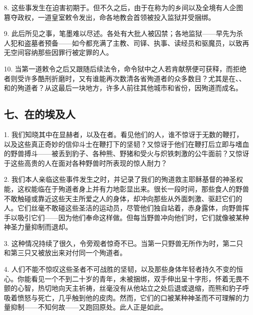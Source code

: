 8. 这些事发生在迫害初期于。但不久之后，由于在称为的乡间以及全境有人企图篡夺政权，一道皇室敕令发出，命各地教会首领被投入监狱并受捆绑。\par

9. 此后所见之事，笔墨难以尽述。各处有大批人被囚禁；各地监狱——早先为杀人犯和盗墓者预备——如今都充满了主教、司铎、执事、读经员和驱魔员，以致再无空间容纳那些因罪行被定罪的人。\par

10. 当第一道敕令之后又跟随后续法令，命令狱中之人若肯献祭便可获释，而拒绝者则受许多酷刑折磨时，又有谁能再次数清各省殉道者的众多数目？尤其是在、、和的殉道者？从这最后一块地方，许多人前往其他城市和省份，因殉道而成名。\par


\subsection{七、在的埃及人}

1. 我们知晓其中在显赫者，以及在者。看见他们的人，谁不惊讶于无数的鞭打，以及这些真正奇妙的信仰斗士在鞭打下的坚韧？又惊讶于他们在鞭打后立即与嗜血的野兽搏斗——被丢到豹子、各种熊、野猪和受火与炽铁刺激的公牛面前？又惊讶于这些高贵的人在面对各种野兽时所表现的惊人耐力？\par

2. 我们本人亲临这些事件发生之时，并记录了我们的殉道救主耶稣基督的神圣权能，这权能临在于殉道者身上并有力地彰显出来。很长一段时间，那些食人的野兽不敢触碰或靠近这些天主所爱之人的身体，却冲向那些从外面刺激、驱赶它们的人。它们丝毫不敢碰这些圣洁的运动员，尽管他们独自站着，赤身露体，向野兽挥手以吸引它们——因为他们奉命这样做。但每当野兽冲向他们时，它们就像被某种神圣力量抑制而退却。\par

3. 这种情况持续了很久，令旁观者惊奇不已。当第一只野兽无所作为时，第二只和第三只又被放出来对付同一个殉道者。\par

4. 人们不能不惊叹这些圣者不可战胜的坚韧，以及那些身体年轻者持久不变的恒心。你能看见一个不到二十岁的青年，未被捆绑，双手伸出呈十字形，怀着无畏不颤的心智，热切地向天主祈祷，丝毫没有从他站立之处后退或退缩，而熊和豹子呼吸着愤怒与死亡，几乎触到他的皮肉。然而，它们的口被某种神圣而不可理解的力量抑制——不知何故——又跑回原处。此人正是如此。\par

